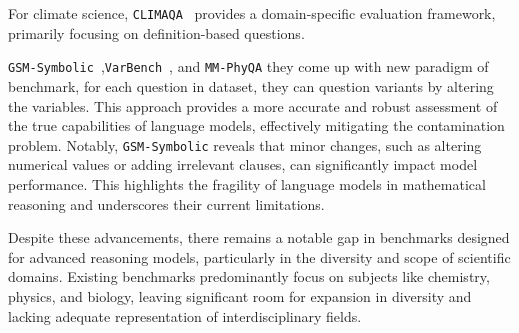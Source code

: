 {For climate science, \texttt{CLIMAQA}~\cite{manivannan2024climaqa} provides a domain-specific evaluation framework, primarily focusing on definition-based questions.


\texttt{GSM-Symbolic}~\cite{mirzadeh2024gsm},\texttt{VarBench}~\cite{qian2024varbench}, and \texttt{MM-PhyQA} they come up with new paradigm of benchmark, for each question in dataset, they can question variants by altering the variables. This approach provides a more accurate and robust assessment of the true capabilities of language models, effectively mitigating the contamination problem. 
Notably, \texttt{GSM-Symbolic} reveals that minor changes, such as altering numerical values or adding irrelevant clauses, can significantly impact model performance. This highlights the fragility of language models in mathematical reasoning and underscores their current limitations.



Despite these advancements, there remains a notable gap in benchmarks designed for advanced reasoning models, particularly in the diversity and scope of scientific domains. Existing benchmarks predominantly focus on subjects like chemistry, physics, and biology, leaving significant room for expansion in diversity and lacking adequate representation of interdisciplinary fields. 

}
